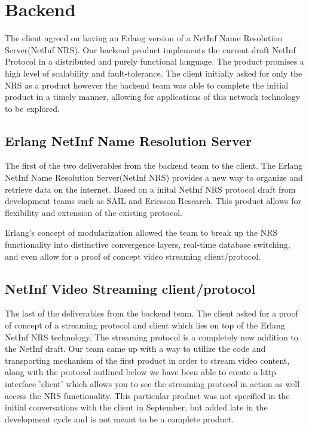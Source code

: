 \section {Backend}

The client agreed on having an Erlang version of a NetInf Name Resolution Server(NetInf NRS).  Our backend product implements the current draft NetInf Protocol in a distributed and purely functional language. The product promises a high level of scalability and fault-tolerance. The client initially asked for only the NRS as a product however the backend team was able to complete the initial product in a timely manner, allowing for applications of this network technology to be explored. 


\subsection {Erlang NetInf Name Resolution Server}
The first of the two deliverables from the backend team to the client. The Erlang NetInf Name Resolution Server(NetInf NRS) provides a new way to organize and retrieve data on the internet. Based on a inital NetInf NRS protocol draft from development teams such as SAIL and Ericsson Research. This product allows for flexibility and extension of the existing protocol.

Erlang's concept of modularization allowed the team to break up the NRS functionality into distinctive convergence layers, real-time database switching, and even allow for a proof of concept video streaming client/protocol. 

\subsection{NetInf Video Streaming client/protocol}

The last of the deliverables from the backend team. The client asked for a proof of concept of a streaming protocol and client which lies on top of the Erlang NetInf NRS technology. The streaming protocol is a completely new addition to the NetInf draft. Our team came up with a way to utilize the code and transporting mechanism of the first product in order to stream video content, along with the protocol outlined below we have been able to create a http interface 'client' which allows you to see the streaming protocol in action as well access the NRS functionality. This particular product was not specified in the initial conversations with the client in September, but added late in the development cycle and is not meant to be a complete product.
